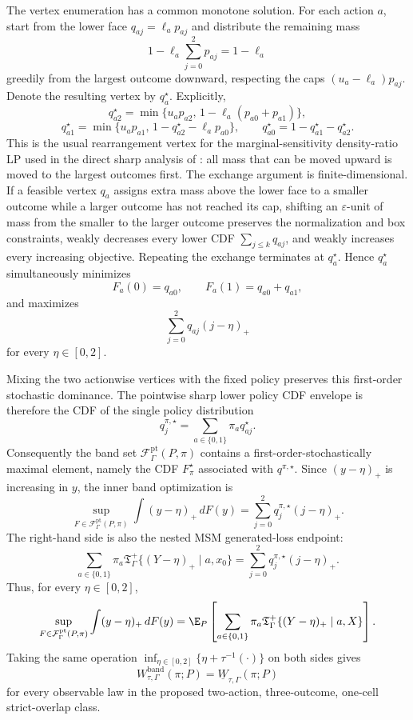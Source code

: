 The vertex enumeration has a common monotone solution.  For each action \(a\), start from the lower
face \(q_{aj}=\ell_a p_{aj}\) and distribute the remaining mass
\[
1-\ell_a\sum_{j=0}^2p_{aj}=1-\ell_a
\]
greedily from the largest outcome downward, respecting the caps
\((u_a-\ell_a)p_{aj}\).  Denote the resulting vertex by \(q_a^\star\).  Explicitly,
\[
q^\star_{a2}=\min\{u_ap_{a2},\,1-\ell_a(p_{a0}+p_{a1})\},
\]
\[
q^\star_{a1}=\min\{u_ap_{a1},\,1-q^\star_{a2}-\ell_ap_{a0}\},
\qquad
q^\star_{a0}=1-q^\star_{a1}-q^\star_{a2}.
\]
This is the usual rearrangement vertex for the marginal-sensitivity density-ratio LP used in the
direct sharp analysis of \cite{DornGuo2021QuantileBalancing}: all mass that can be moved upward is
moved to the largest outcomes first.  The exchange argument is finite-dimensional.  If a feasible
vertex \(q_a\) assigns extra mass above the lower face to a smaller outcome while a larger outcome
has not reached its cap, shifting an \(\varepsilon\)-unit of mass from the smaller to the larger
outcome preserves the normalization and box constraints, weakly decreases every lower CDF
\(\sum_{j\le k}q_{aj}\), and weakly increases every increasing objective.  Repeating the exchange
terminates at \(q_a^\star\).  Hence \(q_a^\star\) simultaneously minimizes
\[
F_a(0)=q_{a0},\qquad F_a(1)=q_{a0}+q_{a1},
\]
and maximizes
\[
\sum_{j=0}^2 q_{aj}(j-\eta)_+
\]
for every \(\eta\in[0,2]\).

Mixing the two actionwise vertices with the fixed policy preserves this first-order stochastic
dominance.  The pointwise sharp lower policy CDF envelope is therefore the CDF of the single
policy distribution
\[
q^{\pi,\star}_j=\sum_{a\in\{0,1\}}\pi_a q^\star_{aj}.
\]
Consequently the band set
\(\mathcal F_{\Gamma}^{\mathrm{pt}}(P,\pi)\) contains a first-order-stochastically maximal element,
namely the CDF \(F^\star_\pi\) associated with \(q^{\pi,\star}\).  Since
\((y-\eta)_+\) is increasing in \(y\), the inner band optimization is
\[
\sup_{F\in\mathcal F_{\Gamma}^{\mathrm{pt}}(P,\pi)}
\int (y-\eta)_+\,dF(y)
=
\sum_{j=0}^2 q^{\pi,\star}_j(j-\eta)_+.
\]
The right-hand side is also the nested MSM generated-loss endpoint:
\[
\sum_{a\in\{0,1\}}\pi_a
\mathfrak T_\Gamma^+\{(Y-\eta)_+\mid a,x_0\}
=
\sum_{j=0}^2 q^{\pi,\star}_j(j-\eta)_+.
\]
Thus, for every \(\eta\in[0,2]\),
\[
\sup_{F\in\mathcal F_{\Gamma}^{\mathrm{pt}}(P,\pi)}
\int (y-\eta)_+\,dF(y)
=
\E_P\left[
\sum_{a\in\{0,1\}}\pi_a
\mathfrak T_\Gamma^+\{(Y-\eta)_+\mid a,X\}
\right].
\]
Taking the same operation \(\inf_{\eta\in[0,2]}\{\eta+\tau^{-1}(\cdot)\}\) on both sides gives
\[
W_{\tau,\Gamma}^{\mathrm{band}}(\pi;P)
=
\underline W_{\tau,\Gamma}(\pi;P)
\]
for every observable law in the proposed two-action, three-outcome, one-cell strict-overlap class.

